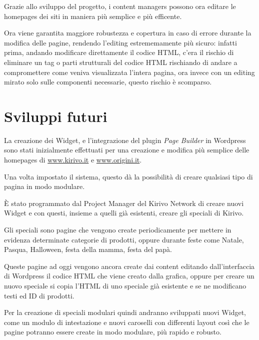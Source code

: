 
Grazie allo sviluppo del progetto, i content managers possono ora editare le
homepages dei siti in maniera più semplice e più efficente.

Ora viene garantita maggiore robustezza e copertura in caso di errore durante la modifica delle pagine,
rendendo l'editing estrememamente più sicuro: infatti prima, andando modificare direttamente il codice HTML, c'era il rischio di eliminare
un tag o parti strutturali del codice HTML rischiando di andare a compromettere come veniva visualizzata l'intera pagina,
ora invece con un editing mirato solo sulle componenti necessarie, questo rischio è scomparso.

\section{Sviluppi futuri}

La creazione dei Widget, e l'integrazione del plugin \emph{Page Builder} in Wordpress sono stati
inizialmente effettuati per una creazione e modifica più semplice delle homepages di \url{www.kirivo.it} 
e \url{www.origini.it}.

Una volta impostato il sistema, questo dà la possibilità di creare qualsiasi tipo di pagina in modo modulare.

È stato programmato dal Project Manager del Kirivo Network di creare nuovi Widget e con questi, insieme a quelli 
già esistenti, creare gli speciali di Kirivo.

Gli speciali sono pagine che vengono create periodicamente per mettere in evidenza determinate categorie di prodotti,
oppure durante feste come Natale, Pasqua, Halloween, festa della mamma, festa del papà.

Queste pagine ad oggi vengono ancora create dai content editando dall'interfaccia di Wordpress il codice HTML che
viene creato dalla grafica, oppure per creare un nuovo speciale si copia l'HTML di uno speciale già esistente e se ne modificano testi
ed ID di prodotti.

Per la creazione di speciali modulari quindi andranno sviluppati nuovi Widget, come un modulo di intestazione
e nuovi caroselli con differenti layout così che le pagine potranno essere create in modo modulare, più rapido
e robusto.
